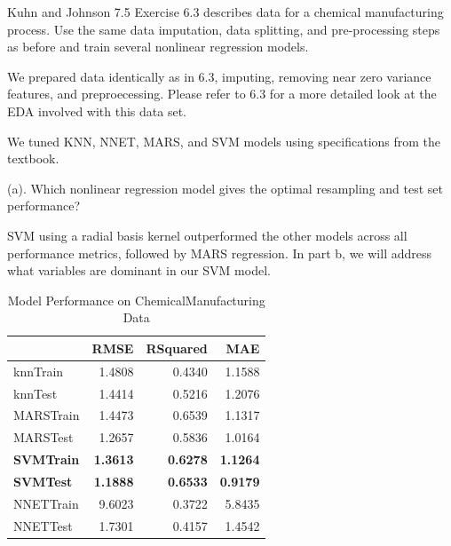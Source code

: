 \documentclass[]{report}
\begin{document}

\begin{question}{Kuhn and Johnson 7.5}
Exercise 6.3 describes data for a chemical manufacturing process. Use the same data imputation, data splitting, and pre-processing steps as before and train several nonlinear regression models.
\end{question}

We prepared data identically as in 6.3, imputing, removing near zero
variance features, and preproecessing. Please refer to 6.3 for a more
detailed look at the EDA involved with this data set.

We tuned KNN, NNET, MARS, and SVM models using specifications from the
textbook.

\begin{subquestion}{(a).}
Which nonlinear regression model gives the optimal resampling and test set performance? 
\end{subquestion}

SVM using a radial basis kernel outperformed the other models across all
performance metrics, followed by MARS regression. In part b, we will
address what variables are dominant in our SVM model.

\begin{table}[H]

\caption{\label{tab:unnamed-chunk-1}Model Performance on ChemicalManufacturing Data}
\centering
\fontsize{8}{10}\selectfont
\begin{tabular}[t]{l|r|r|r}
\hline
\textbf{ } & \textbf{RMSE} & \textbf{RSquared} & \textbf{MAE}\\
\hline
\rowcolor{gray!6}  knnTrain & 1.4808 & 0.4340 & 1.1588\\
\hline
knnTest & 1.4414 & 0.5216 & 1.2076\\
\hline
\rowcolor{gray!6}  MARSTrain & 1.4473 & 0.6539 & 1.1317\\
\hline
MARSTest & 1.2657 & 0.5836 & 1.0164\\
\hline
\rowcolor{gray!6}  \rowcolor[HTML]{d9f2e6}  \textbf{SVMTrain} & \textbf{1.3613} & \textbf{0.6278} & \textbf{1.1264}\\
\hline
\rowcolor[HTML]{d9f2e6}  \textbf{SVMTest} & \textbf{1.1888} & \textbf{0.6533} & \textbf{0.9179}\\
\hline
\rowcolor{gray!6}  NNETTrain & 9.6023 & 0.3722 & 5.8435\\
\hline
NNETTest & 1.7301 & 0.4157 & 1.4542\\
\hline
\end{tabular}
\end{table}
\end{document}
